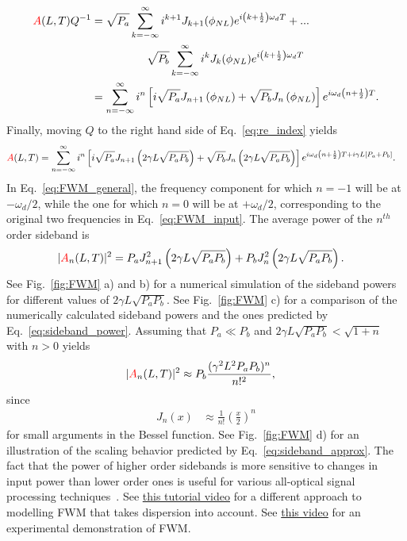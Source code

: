 \begin{align}
\label{eq:re_index}
    \textcolor{red}{A}(L,T)Q^{-1}&=\sqrt{P_a}\sum_{k=-\infty}^{\infty}i^{k+1}J_{k+1}(\phi_{NL})e^{i\left(k+\frac{1}{2}\right)\omega_dT}+...\\ \nonumber & \quad\quad\quad\quad\quad\sqrt{P_b}\sum_{k=-\infty}^{\infty}i^kJ_k(\phi_{NL})e^{i\left(k+\frac{1}{2}\right)\omega_dT} \\ \nonumber
    &= \sum_{n=-\infty}^{\infty} i^n\left[i\sqrt{P_a}J_{n+1}\left(\phi_{NL}\right)+\sqrt{P_b}J_n\left(\phi_{NL}\right)\right]e^{i\omega_d\left(n+\frac{1}{2}\right)T}.
\end{align}
Finally, moving $Q$ to the right hand side of Eq.~\ref{eq:re_index} yields
\begin{align}
\label{eq:FWM_general}
    \textcolor{red}{A}(L,T)&=\sum_{n=-\infty}^{\infty} i^n\left[i\sqrt{P_a}J_{n+1}\left(2\gamma L\sqrt{P_aP_b}\right)+\sqrt{P_b}J_n\left(2\gamma L\sqrt{P_aP_b}\right)\right]e^{i\omega_d\left(n+\frac{1}{2}\right)T+i\gamma L[P_a+P_b]}.
\end{align}
In Eq.~\ref{eq:FWM_general}, the frequency component for which $n=-1$ will be at $-\omega_d/2$, while the one for which $n=0$ will be at $+\omega_d/2$, corresponding to the original two frequencies in Eq.~\ref{eq:FWM_input}. The average power of the $n^{th}$ order sideband is
\begin{align}
\label{eq:sideband_power}
    |\textcolor{red}{A}_n(L,T)|^2 &= P_aJ^2_{n+1}\left(2\gamma L \sqrt{P_aP_b}\right)+P_bJ^2_{n}\left(2\gamma L \sqrt{P_aP_b}\right).
\end{align}
See Fig.~\ref{fig:FWM} a) and b) for a numerical simulation of the sideband powers for different values of $2\gamma L \sqrt{P_aP_b}$. See Fig.~\ref{fig:FWM} c) for a comparison of the numerically calculated sideband powers and the ones predicted by Eq.~\ref{eq:sideband_power}. Assuming that $P_a\ll P_b$ and $2\gamma L\sqrt{P_aP_b}<\sqrt{1+n}$ with $n>0$ yields
\begin{align}
\label{eq:sideband_approx}
    |\textcolor{red}{A}_n(L,T)|^2 &\approx P_b\frac{(\gamma^2 L^2P_aP_b)^{n}}{n!^2},
\end{align}
since
\begin{align}
\label{eq:Bessel_approx}
    J_n(x)&\approx \frac{1}{n!}\left(\frac{x}{2}\right)^n
\end{align}
for small arguments in the Bessel function. See Fig.~\ref{fig:FWM} d) for an illustration of the scaling behavior predicted by Eq.~\ref{eq:sideband_approx}. The fact that the power of higher order sidebands is more sensitive to changes in input power than lower order ones is useful for various all-optical signal processing techniques~\cite{my_thesis,BenoitPhD,YangLuPhD}. See \href{https://youtu.be/0SXPvO89jto}{this tutorial video} for a different approach to modelling FWM that takes dispersion into account. See \href{https://youtu.be/gsa9hrCbnqI}{this video} for an experimental demonstration of FWM. 
